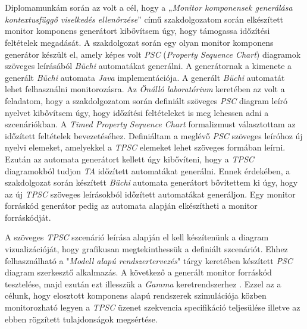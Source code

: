 \chapter{\bevezetes}
Diplomamunkám során az volt a cél, hogy a „\textit{Monitor komponensek generálása kontextusfüggő viselkedés ellenőrzése}” \cite{Bakai} című szakdolgozatom során elkészített monitor komponens generátort kibővítsem úgy, hogy támogassa időzítési feltételek megadását.
A szakdolgozat során egy olyan monitor komponens generátor készült el, amely képes volt \textit{PSC} (\textit{Property Sequence Chart}) \cite{PSC1} diagramok szöveges leírásából \textit{Büchi} \cite{PSC1} automatákat generálni.
A generátornak a kimenete a generált \textit{Büchi} automata \textit{Java} implementációja.
A generált \textit{Büchi} automatát lehet felhasználni monitorozásra.
Az \textit{Önálló laboratórium} keretében az volt a feladatom, hogy a szakdolgozatom során definiált szöveges \textit{PSC} diagram leíró nyelvet kibővítsem úgy, hogy időzítési feltételeket is meg lehessen adni a szcenáriókban.
A \textit{Timed Property Sequence Chart} \cite{TPSC1} formalizmust választottam az időzített feltételek bevezetéséhez.
Definiáltam a meglévő \textit{PSC} szöveges leíróhoz új nyelvi elemeket, amelyekkel a \textit{TPSC} elemeket lehet szöveges formában leírni.
Ezután az automata generátort kellett úgy kibővíteni, hogy a \textit{TPSC} diagramokból tudjon \textit{TA} időzített automatákat \cite{TPSC1} generálni.
Ennek érdekében, a szakdolgozat során készített \textit{Büchi} automata generátort bővítettem ki úgy, hogy az új \textit{TPSC} szöveges leírásokból időzített automatákat generáljon.
Egy monitor forráskód generátor pedig az automata alapján elkészítheti a monitor forráskódját.

A szöveges \textit{TPSC} szcenárió leírása alapján el kell készítenünk a diagram vizualizációját, hogy grafikusan megtekinthessük a definiált szcenáriót.
Ehhez felhasználható a "\textit{Modell alapú rendszertervezés}" tárgy keretében készített \textit{PSC} diagram szerkesztő alkalmazás.
A következő a generált monitor forráskód tesztelése, majd ezután ezt illesszük a \textit{Gamma} keretrendszerhez \cite{Gamma}.
Ezzel az a célunk, hogy elosztott komponens alapú rendszerek szimulációja közben monitorozható legyen a \textit{TPSC} üzenet szekvencia specifikáció teljesülése illetve az ebben rögzített tulajdonságok megsértése.

